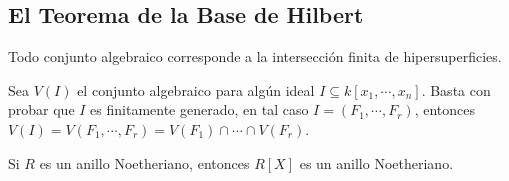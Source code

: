 \documentclass{article}
\begin{document}
\subsection{El Teorema de la Base de Hilbert}
\begin{teo}
    Todo conjunto algebraico corresponde a la intersección finita de hipersuperficies.
\end{teo}

\begin{dem}
    Sea $V(I)$ el conjunto algebraico para algún ideal $I\subseteq k[x_{1},\cdots,x_{n}]$. 
    Basta con probar que $I$ es finitamente generado, en tal caso $I=(F_{1},\cdots,F_{r})$, 
    entonces $V(I)=V(F_{1},\cdots,F_{r})=V(F_{1})\cap\cdots\cap V(F_{r})$.
\end{dem}

\begin{teo}
    Si $R$ es un anillo Noetheriano, entonces $R[X]$ es un anillo Noetheriano.
\end{teo}
\end{document}
